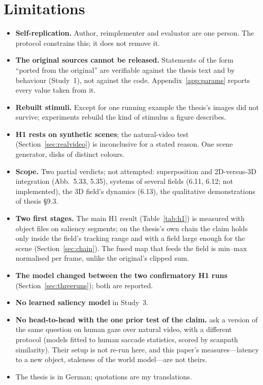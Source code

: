 \documentclass[11pt,a4paper]{article}
\begin{document}
\section{Limitations}
\label{sec:limits}
\begin{itemize}
  \item \textbf{Self-replication.} Author, reimplementer and evaluator are one
        person. The protocol constrains this; it does not remove it.
  \item \textbf{The original sources cannot be released.} Statements of the form
        ``ported from the original'' are verifiable against the thesis text and
        by behaviour (Study~1), not against the code. Appendix~\ref{app:params}
        reports every value taken from it.
  \item \textbf{Rebuilt stimuli.} Except for one running example the thesis's
        images did not survive; experiments rebuild the kind of stimulus a figure
        describes.
  \item \textbf{H1 rests on synthetic scenes}; the natural-video test
        (Section~\ref{sec:realvideo}) is inconclusive for a stated reason. One
        scene generator, disks of distinct colours.
  \item \textbf{Scope.} Two partial verdicts; not attempted: superposition and
        2D-versus-3D integration (Abb.~5.33, 5.35), systems of several fields
        (6.11, 6.12; not implemented), the 3D field's dynamics (6.13), the
        qualitative demonstrations of thesis \S9.3.
  \item \textbf{Two first stages.} The main H1 result (Table~\ref{tab:h1}) is
        measured with object files on saliency segments; on the thesis's own
        chain the claim holds only inside the field's tracking range and with a
        field large enough for the scene (Section~\ref{sec:chain}). The fused
        map that feeds the field is min--max normalised per frame, unlike the
        original's clipped sum.
  \item \textbf{The model changed between the two confirmatory H1 runs}
        (Section~\ref{sec:threeruns}); both are reported.
  \item \textbf{No learned saliency model} in Study~3.
  \item \textbf{No head-to-head with the one prior test of the claim.}
        \citet{roth2023} ask a version of the same question on human gaze over
        natural video, with a different protocol (models fitted to human saccade
        statistics, scored by scanpath similarity). Their setup is not re-run
        here, and this paper's measures---latency to a new object, staleness of
        the world model---are not theirs.
  \item The thesis is in German; quotations are my translations.
\end{itemize}
\end{document}
